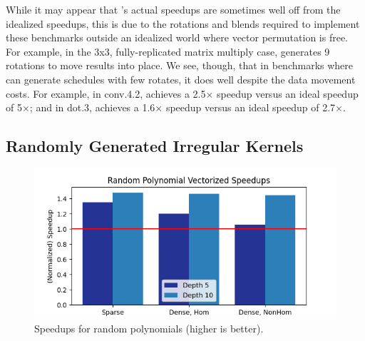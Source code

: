 While it may appear that \system's actual speedups are sometimes well off from the idealized speedups, this is due to the rotations and blends required to implement these benchmarks outside an idealized world where vector permutation is free. For example, in the \textsf{3x3}, fully-replicated matrix multiply case, \system generates 9 rotations to move results into place. We see, though, that in benchmarks where \system can generate schedules with few rotates, it does well despite the data movement costs. For example, in \textsf{conv.4.2}, \system achieves a 2.5$\times$ speedup versus an ideal speedup of 5$\times$; and in \textsf{dot.3}, \system achieves a 1.6$\times$ speedup versus an ideal speedup of 2.7$\times$.


\subsection{Randomly Generated Irregular Kernels}
\begin{figure}[t]
	\centering
    \includegraphics[width=0.9\linewidth]{figures/graphs/trees.png}
    \caption{Speedups for random polynomials (higher is better).}\label{fig:polynomial-speedups}
\end{figure}

